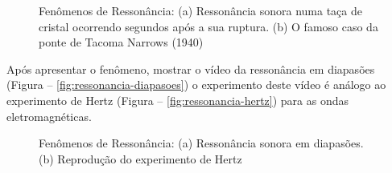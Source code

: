     \vspace{10pt}
    \begin{figure}[!ht]        
        \centering              
        \hspace{20pt}
        \caption{Fenômenos de Ressonância: (a) Ressonância sonora numa taça de cristal ocorrendo segundos após a sua ruptura. (b) O famoso caso da ponte de Tacoma Narrows (1940)}
        \label{fig:ressonancia-1}
    \end{figure}        
    \vspace*{10pt}
    \newpage
    Após apresentar o fenômeno, mostrar o vídeo da ressonância em diapasões (Figura -- \autoref{fig:ressonancia-diapasoes}) o experimento deste vídeo é análogo ao experimento de Hertz (Figura -- \autoref{fig:ressonancia-hertz}) para as ondas eletromagnéticas.    
    \vspace{10pt}
    \begin{figure}[!ht]        
        \centering              
        \hspace{20pt}
        \caption{Fenômenos de Ressonância: (a) Ressonância sonora em diapasões. (b) Reprodução do experimento de Hertz}
        \label{fig:ressonancia-2}
    \end{figure}        
